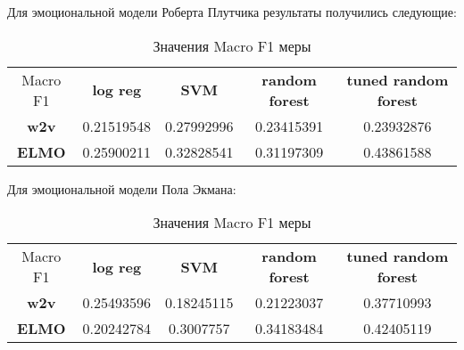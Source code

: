Для эмоциональной модели Роберта Плутчика результаты получились следующие:

\bigskip
\begin{table}[ht]
\caption{Значения Macro F1 меры}
\label{tab:plutchik}
\centering
\begin{tabular}{ccccc}
Macro F1 & \textbf{log reg} & \textbf{SVM} & \textbf{random forest} & \textbf{tuned random forest}\\
\textbf{w2v} & 0.21519548 & 0.27992996 & 0.23415391 & 0.23932876\\
\textbf{ELMO} & 0.25900211 & 0.32828541 & 0.31197309 & 0.43861588
\end{tabular}
\end{table}


Для эмоциональной модели Пола Экмана:

\bigskip
\begin{table}[ht]
\caption{Значения Macro F1 меры}
\label{tab:ekman}
\centering
\begin{tabular}{ccccc}
Macro F1 & \textbf{log reg} & \textbf{SVM} & \textbf{random forest} & \textbf{tuned random forest}\\
\textbf{w2v} & 0.25493596 & 0.18245115 & 0.21223037 & 0.37710993 \\
\textbf{ELMO}& 0.20242784 & 0.3007757 & 0.34183484 & 0.42405119
\end{tabular}
\end{table}









































